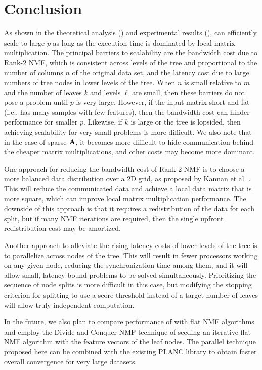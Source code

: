 
\section{Conclusion}

As shown in the theoretical analysis () and experimental results (),  can efficiently scale to large $p$ as long as the execution time is dominated by local matrix multiplication.
The principal barriers to scalability are the bandwidth cost due to Rank-2 NMF, which is consistent across levels of the tree and proportional to the number of columns $n$ of the original data set, and the latency cost due to large numbers of tree nodes in lower levels of the tree.
When $n$ is small relative to $m$ and the number of leaves $k$ and levels $\ell$ are small, then these barriers do not pose a problem until $p$ is very large.
However, if the input matrix short and fat (i.e., has many samples with few features), then the bandwidth cost can hinder performance for smaller $p$.
Likewise, if $k$ is large or the tree is lopsided, then achieving scalability for very small problems is more difficult.
We also note that in the case of sparse $\M{A}$, it becomes more difficult to hide communication behind the cheaper matrix multiplications, and other costs may become more dominant.

One approach for reducing the bandwidth cost of Rank-2 NMF is to choose a more balanced data distribution over a 2D grid, as proposed by Kannan et al. \cite{KBP16}.
This will reduce the communicated data and achieve a local data matrix that is more square, which can improve local matrix multiplication performance.
The downside of this approach is that it requires a redistribution of the data for each split, but if many NMF iterations are required, then the single upfront redistribution cost may be amortized.

Another approach to alleviate the rising latency costs of lower levels of the tree is to parallelize across nodes of the tree.
This will result in fewer processors working on any given node, reducing the synchronization time among them, and it will allow small, latency-bound problems to be solved simultaneously.
Prioritizing the sequence of node splits is more difficult in this case, but modifying the stopping criterion for splitting to use a score threshold instead of a target number of leaves will allow truly independent computation.

In the future, we also plan to compare performance of  with flat NMF algorithms and employ the Divide-and-Conquer NMF technique \cite{DKDP17} of seeding an iterative flat NMF algorithm with the feature vectors of the leaf nodes.
The parallel technique proposed here can be combined with the existing PLANC library \cite{EH+19-TR} to obtain faster overall convergence for very large datasets.
